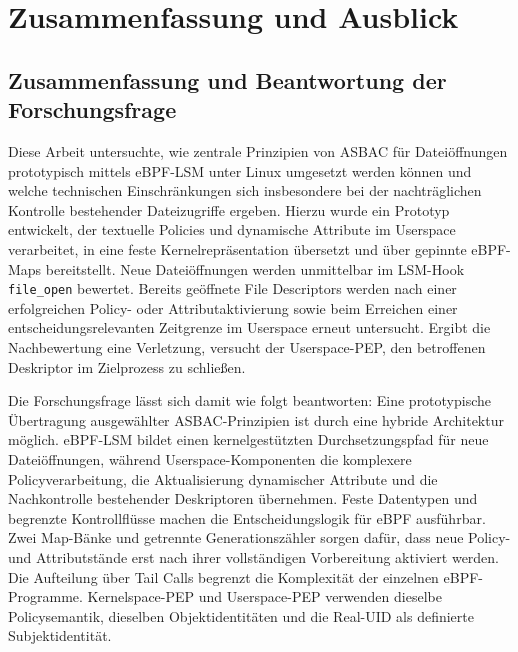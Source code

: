 \section{Zusammenfassung und Ausblick}

\subsection{Zusammenfassung und Beantwortung der Forschungsfrage}

Diese Arbeit untersuchte, wie zentrale Prinzipien von ASBAC für Dateiöffnungen prototypisch mittels eBPF-LSM unter Linux umgesetzt werden können und welche technischen Einschränkungen sich insbesondere bei der nachträglichen Kontrolle bestehender Dateizugriffe ergeben. Hierzu wurde ein Prototyp entwickelt, der textuelle Policies und dynamische Attribute im Userspace verarbeitet, in eine feste Kernelrepräsentation übersetzt und über gepinnte eBPF-Maps bereitstellt. Neue Dateiöffnungen werden unmittelbar im LSM-Hook \texttt{file\_open} bewertet. Bereits geöffnete File Descriptors werden nach einer erfolgreichen Policy- oder Attributaktivierung sowie beim Erreichen einer entscheidungsrelevanten Zeitgrenze im Userspace erneut untersucht. Ergibt die Nachbewertung eine Verletzung, versucht der Userspace-PEP, den betroffenen Deskriptor im Zielprozess zu schließen.

Die Forschungsfrage lässt sich damit wie folgt beantworten: Eine prototypische Übertragung ausgewählter ASBAC-Prinzipien ist durch eine hybride Architektur möglich. eBPF-LSM bildet einen kernelgestützten Durchsetzungspfad für neue Dateiöffnungen, während Userspace-Komponenten die komplexere Policyverarbeitung, die Aktualisierung dynamischer Attribute und die Nachkontrolle bestehender Deskriptoren übernehmen. Feste Datentypen und begrenzte Kontrollflüsse machen die Entscheidungslogik für eBPF ausführbar. Zwei Map-Bänke und getrennte Generationszähler sorgen dafür, dass neue Policy- und Attributstände erst nach ihrer vollständigen Vorbereitung aktiviert werden. Die Aufteilung über Tail Calls begrenzt die Komplexität der einzelnen eBPF-Programme. Kernelspace-PEP und Userspace-PEP verwenden dieselbe Policysemantik, dieselben Objektidentitäten und die Real-UID als definierte Subjektidentität.

